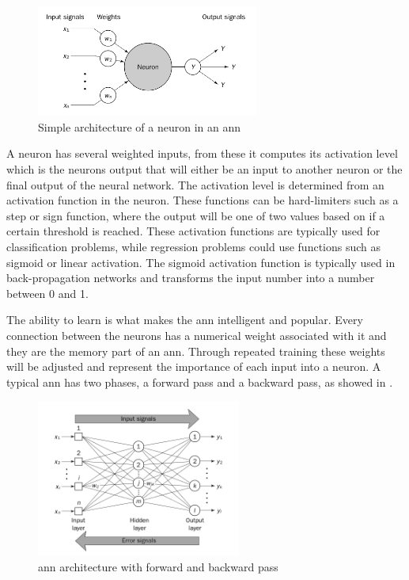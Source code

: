 \documentclass[english, a4paper]{report}
\begin{document}
{{{            \begin{figure}[H]
                \centering
                \includegraphics[width=0.65\textwidth]{NeuronDiagram}
                \caption{Simple architecture of a neuron in an \gls{ann} \cite{artificialIntelligence}}
                \label{fig:NeuronDiagram}
            \end{figure}
            
            \par
            A neuron has several weighted inputs, from these it computes its activation level which is the neurons output that will either be an input to another neuron or the final output of the neural network. The activation level is determined from an activation function in the neuron. These functions can be hard-limiters such as a step or sign function, where the output will be one of two values based on if a certain threshold is reached. These activation functions are typically used for classification problems, while regression problems could use functions such as sigmoid or linear activation. The sigmoid activation function is typically used in back-propagation networks and transforms the input number into a number between 0 and 1. 
            \par
            The ability to learn is what makes the \gls{ann} intelligent and popular. Every connection between the neurons has a numerical weight associated with it and they are the memory part of an \gls{ann}. Through repeated training these weights will be adjusted and represent the importance of each input into a neuron.
            A typical \gls{ann} has two phases, a forward pass and a backward pass, as showed in .
            
            \begin{figure}[H]
                \centering
                \includegraphics[width=0.6\textwidth]{twoPhaseNN}
                \caption{\gls{ann} architecture with forward and backward pass \cite{artificialIntelligence}}
                \label{fig:twoPhaseNN}
            \end{figure}
            
}}}
\end{document}
